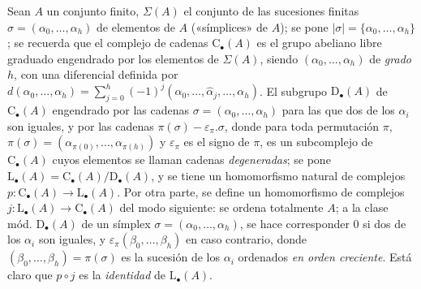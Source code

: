 \begin{env}[11.8.1]
\label{0.11.8.1-fr}
Sean $A$ un conjunto finito, $\Sigma(A)$ el conjunto de las sucesiones finitas $\sigma=(\alpha_0,\ldots,\alpha_h)$ de elementos de $A$ («símplices» de $A$); se pone $|\sigma|=\{\alpha_0,\ldots,\alpha_h\}$; se recuerda que el complejo de cadenas $\mathrm C_\bullet(A)$ es el grupo abeliano libre graduado engendrado por los elementos de $\Sigma(A)$, siendo $(\alpha_0,\ldots,\alpha_h)$ de \emph{grado} $h$, con una diferencial definida por $d(\alpha_0,\ldots,\alpha_h)=\sum_{j=0}^{h}(-1)^j(\alpha_0,\ldots,\widehat{\alpha}_j,\ldots,\alpha_h)$. El subgrupo $\mathrm D_\bullet(A)$ de $\mathrm C_\bullet(A)$ engendrado por las cadenas $\sigma=(\alpha_0,\ldots,\alpha_h)$ para las que dos de los $\alpha_i$ son iguales, y por las cadenas $\pi(\sigma)-\varepsilon_\pi.\sigma$, donde para toda permutación $\pi$, $\pi(\sigma)=(\alpha_{\pi(0)},\ldots,\alpha_{\pi(h)})$ y $\varepsilon_\pi$ es el signo de $\pi$, es un subcomplejo de $\mathrm C_\bullet(A)$ cuyos elementos se llaman cadenas \emph{degeneradas}; se pone $\mathrm L_\bullet(A)=\mathrm C_\bullet(A)/\mathrm D_\bullet(A)$, y se tiene un homomorfismo natural de complejos $p:\mathrm C_\bullet(A)\longrightarrow\mathrm L_\bullet(A)$. Por otra parte, se define un homomorfismo de complejos $j:\mathrm L_\bullet(A)\longrightarrow\mathrm C_\bullet(A)$ del modo siguiente: se ordena totalmente $A$; a la clase mód. $\mathrm D_\bullet(A)$ de un símplex $\sigma=(\alpha_0,\ldots,\alpha_h)$, se hace corresponder $0$ si dos de los $\alpha_i$ son iguales, y $\varepsilon_\pi(\beta_0,\ldots,\beta_h)$ en caso contrario, donde $(\beta_0,\ldots,\beta_h)=\pi(\sigma)$ es la sucesión de los $\alpha_i$ ordenados \emph{en orden creciente}. Está claro que $p\circ
j$ es la \emph{identidad} de $\mathrm L_\bullet(A)$.
\end{env}

